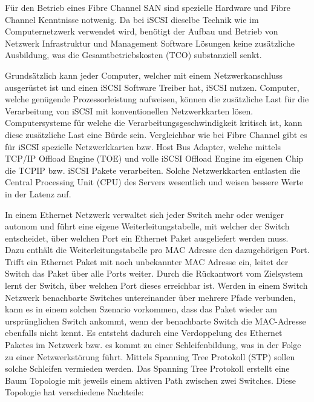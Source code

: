 Für den Betrieb eines Fibre Channel SAN sind spezielle Hardware und Fibre Channel Kenntnisse notwenig. Da bei iSCSI dieselbe Technik wie im Computernetzwerk verwendet wird, benötigt der Aufbau und Betrieb von Netzwerk Infrastruktur und Management Software Lösungen keine zusätzliche Ausbildung, was die Gesamtbetriebskosten (TCO) substanziell senkt.

Grundsätzlich kann jeder Computer, welcher mit einem Netzwerkanschluss ausgerüstet ist und einen iSCSI Software Treiber hat, iSCSI nutzen. Computer, welche genügende Prozessorleistung aufweisen, können die zusätzliche Last für die Verarbeitung von iSCSI mit konventionellen Netzwerkkarten lösen. Computersysteme für welche die Verarbeitungsgeschwindigkeit kritisch ist, kann diese zusätzliche Last eine Bürde sein. Vergleichbar wie bei Fibre Channel gibt es für iSCSI spezielle Netzwerkkarten bzw. Host Bus Adapter, welche mittels TCP/IP Offload Engine (TOE) und volle iSCSI Offload Engine im eigenen Chip die \gls{TCPIP} bzw. iSCSI Pakete verarbeiten. Solche Netzwerkkarten entlasten die Central Processing Unit (\gls{CPU}) des Servers wesentlich und weisen bessere Werte in der Latenz auf.

In einem Ethernet Netzwerk verwaltet sich jeder Switch mehr oder weniger autonom und führt eine eigene Weiterleitungstabelle, mit welcher der Switch entscheidet, über welchen Port ein Ethernet Paket ausgeliefert werden muss. Dazu enthält die Weiterleitungstabelle pro MAC Adresse den dazugehörigen Port. Trifft ein Ethernet Paket mit noch unbekannter MAC Adresse ein, leitet der Switch das Paket über alle Ports weiter. Durch die Rückantwort vom Zielsystem lernt der Switch, über welchen Port dieses erreichbar ist. Werden in einem Switch Netzwerk benachbarte Switches untereinander über mehrere Pfade verbunden, kann es in einem solchen Szenario vorkommen, dass das Paket wieder am ursprünglichen Switch ankommt, wenn der benachbarte Switch die MAC-Adresse ebenfalls nicht kennt. Es entsteht dadurch eine Verdoppelung des Ethernet Paketes im Netzwerk bzw. es kommt zu einer Schleifenbildung, was in der Folge zu einer Netzwerkstörung führt. Mittels Spanning Tree Protokoll (STP) sollen solche Schleifen vermieden werden. Das Spanning Tree Protokoll erstellt eine Baum Topologie mit jeweils einem aktiven Path zwischen zwei Switches. Diese Topologie hat verschiedene Nachteile: 


